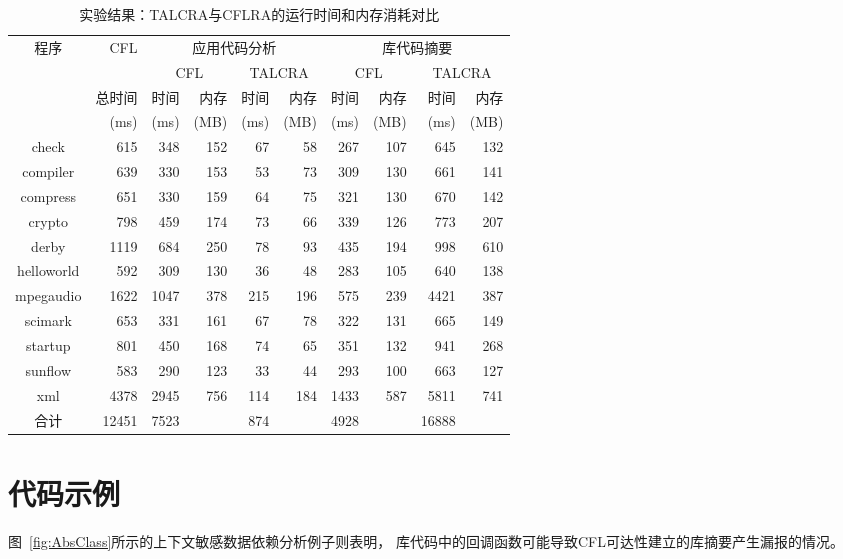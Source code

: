\begin{table}[h]
\center
\caption{\label{tab:main} 实验结果：TALCRA与CFLRA的运行时间和内存消耗对比}
\begin{tabular}{|c||r||rr|rr||rr|rr|}
\hline
程序&CFL&\multicolumn{4}{c||}{应用代码分析}&\multicolumn{4}{c|}{库代码摘要}\\\cline{3-10}
&&\multicolumn{2}{c|}{CFL}&\multicolumn{2}{c||}{TALCRA}&\multicolumn{2}{c|}{CFL}&\multicolumn{2}{c|}{TALCRA}\\
&总时间&时间&内存&时间&内存&时间&内存&时间&内存\\
&(ms)&(ms)&(MB)&(ms)&(MB)&(ms)&(MB)&(ms)&(MB)\\
\hline
\hline
check&615&348&152&67&58&267&107&645&132\\
compiler&639&330&153&53&73&309&130&661&141\\
compress&651&330&159&64&75&321&130&670&142\\
crypto&798&459&174&73&66&339&126&773&207\\
derby&1119&684&250&78&93&435&194&998&610\\
helloworld&592&309&130&36&48&283&105&640&138\\
mpegaudio&1622&1047&378&215&196&575&239&4421&387\\
scimark&653&331&161&67&78&322&131&665&149\\
startup&801&450&168&74&65&351&132&941&268\\
sunflow&583&290&123&33&44&293&100&663&127\\
xml&4378&2945&756&114&184&1433&587&5811&741\\
\hline\hline
合计&12451&7523&&874&&4928&&16888&\\\hline
\end{tabular}
\end{table}

\section{代码示例}

图~\ref{fig:AbsClass}所示的上下文敏感数据依赖分析例子则表明，
库代码中的回调函数可能导致CFL可达性建立的库摘要产生漏报的情况。

